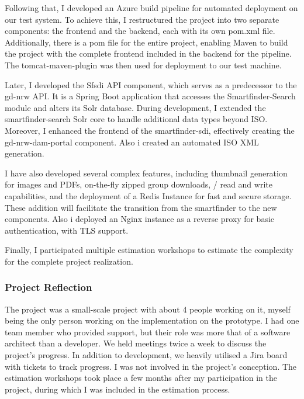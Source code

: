\documentclass[11pt, titlepage, a4paper]{article}
\begin{document}
Following that, I developed an Azure build pipeline for automated deployment on our test system.  To achieve this, I restructured the project into two separate components: the frontend and the backend, each with its own pom.xml file. Additionally, there is a pom file for the entire project, enabling Maven to build the project with the complete frontend included in the backend for the pipeline. The tomcat-maven-plugin was then used for deployment to our test machine.

Later, I developed the Sfsdi API component, which serves as a predecessor to the gd-nrw API. It is a Spring Boot application that accesses the Smartfinder-Search module and alters its Solr database. During development, I extended the smartfinder-search Solr core to handle additional data types beyond ISO. Moreover, I enhanced the frontend of the smartfinder-sdi, effectively creating the gd-nrw-dam-portal component.
Also i created an automated ISO XML generation.

I have also developed several complex features, including thumbnail generation for images and PDFs, on-the-fly zipped group downloads, / read and write capabilities, and the deployment of a Redis Instance for fast and secure storage. These addition will facilitate the transition from the smartfinder to the new components. Also i deployed an Nginx instance as a reverse proxy for basic authentication, with TLS support.

Finally, I participated multiple estimation workshops to estimate the complexity for the complete project realization.

\subsubsection{Project Reflection}
The project was a small-scale project with about 4 people working on it, myself being the only person working on the implementation on the prototype. I had one team member who provided support, but their role was more that of a software architect than a developer. 
We held meetings twice a week to discuss the project's progress. In addition to development, we heavily utilised a Jira board with tickets to track progress. I was not involved in the project's conception.
The estimation workshops took place a few months after my participation in the project, during which I was included in the estimation process.


\subsection{}
\end{document}
